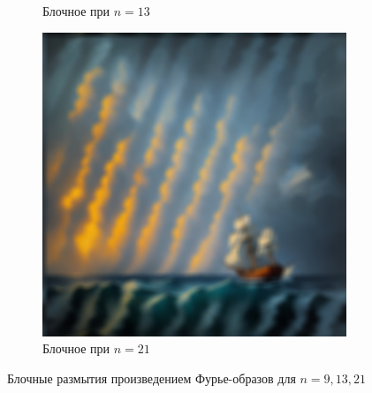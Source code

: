 \documentclass[a4paper, 12pt]{article}
\begin{document}
\begin{figure}[H]
\begin{subfigure}{0.30\textwidth}
            \caption{Блочное при $n=13$}
            \label{fig:bl_fft2_n=13}
        \end{subfigure}
        \begin{subfigure}{0.30\textwidth}
            \centering
            \includegraphics[width=\linewidth]{bl_fft2_n=21.png}
            \caption{Блочное при $n=21$}
            \label{fig:bl_fft2_n=21}
        \end{subfigure}
        \caption{Блочные размытия произведением Фурье-образов для $n=9,13,21$}
        \label{fig:blfft2s}
    \end{figure}
\end{document}
